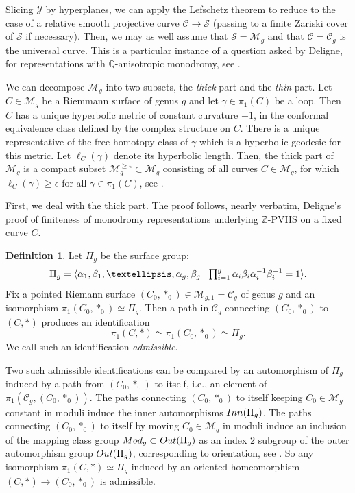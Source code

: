 \documentclass[10pt,letterpaper,english,reqno]{amsart}
\numberwithin{equation}{subsection}
\newcommand\cC{{\mathcal C}}
\newcommand\cM{{\mathcal M}}
\newcommand\cS{{\mathcal S}}
\newcommand\cY{{\mathcal Y}}
\newcommand\Q{{\mathbb Q}}
\newcommand\Z{{\mathbb Z}}
\theoremstyle{definition}
\newtheorem{definition}[theorem]{Definition}
\begin{document}

Slicing $\cY$ by hyperplanes,
we can apply the Lefschetz theorem to reduce to the case
of a relative smooth projective curve $\cC\to \cS$ (passing to a finite Zariski
cover of $\cS$ if necessary). Then, we may
as well assume that $\cS=\cM_g$ and that $\cC=\cC_g$
is the universal curve. This is a particular instance of a question asked by Deligne, for representations with $\Q$-anisotropic monodromy, see \cite[Question 3.13]{deligne87}.
\medskip 

We can decompose $\cM_g$ into two subsets, the {\it thick}
part and the {\it thin} part. Let $C\in \cM_g$ be a Riemmann surface of genus $g$ and let $\gamma\in \pi_1(C)$ be a loop. Then $C$ has a unique hyperbolic metric of constant curvature $-1$, 
in the conformal equivalence class defined
by the complex structure on $C$. There is a unique
representative of the free homotopy class of $\gamma$
which is a hyperbolic geodesic for this metric. Let $\ell_C(\gamma)$ denote its hyperbolic length. Then, the thick part of $\cM_g$
is a compact subset
$\cM_g^{\geq \epsilon}\subset \cM_g$ consisting
of all curves $C\in \mathcal{M}_g$, for which $\ell_C(\gamma)\geq \epsilon$
for all $\gamma\in \pi_1(C)$, see \cite[Cor.~3]{mumford-thick}.

First, we deal with the thick part. The proof follows,
nearly verbatim, Deligne's proof \cite{deligne87}
of finiteness of monodromy representations underlying
$\Z$-PVHS on a fixed curve $C$. 

\begin{definition}\label{identification}
  Let $\Pi_g$ be the surface group:
  $$\Pi_g = \langle \alpha_1,\beta_1,\dots,\alpha_g,\beta_g \,\big{|}\,\textstyle \prod_{i=1}^g\alpha_i\beta_i\alpha_i^{-1}\beta_i^{-1}=1\rangle.$$
  Fix a pointed Riemann surface $(C_0,*_0)\in \cM_{g,1}=\cC_g$ of genus $g$ and an isomorphism $\pi_1(C_0,*_0)\simeq \Pi_g$.
Then a path in $\cC_g$ connecting $(C_0,*_0)$ to $(C,*)$
produces an identification $$\pi_1(C,*)\simeq \pi_1(C_0,*_0)\simeq \Pi_g.$$ We call such an
identification \emph{admissible}.
  \end{definition}

 Two such admissible
identifications can be compared by an 
automorphism of $\Pi_g$ induced by a path
from $(C_0,*_0)$ to itself, i.e., an element
of $\pi_1(\cC_g, (C_0,*_0))$.
The paths connecting $(C_0,*_0)$ to itself
keeping $C_0\in \cM_g$ constant in moduli
induce the inner automorphisms ${\rm Inn}(\Pi_g)$. 
The paths connecting  $(C_0,*_0)$ to itself by moving 
$C_0\in \cM_g$ in moduli induce an inclusion of
the mapping class group ${\rm Mod}_g\subset {\rm Out}(\Pi_g)$
as an index $2$ subgroup of the outer automorphism group ${\rm Out}(\Pi_g)$, corresponding
to orientation, see \cite[Theorem 8.1]{farb-margalit}. So any isomorphism 
$\pi_1(C,*)\simeq \Pi_g$ induced by an oriented
homeomorphism $(C,*)\to (C_0,*_0)$ is admissible.
\end{document}
